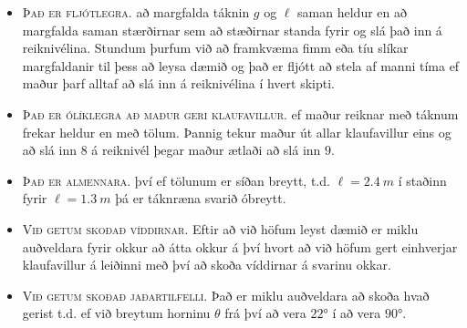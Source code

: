 \begin{itemize}
    \item \textsc{Það er fljótlegra.} að margfalda táknin $g$ og $\ell$ saman heldur en að margfalda saman stærðirnar sem að stæðirnar standa fyrir og slá það inn á reiknivélina. Stundum þurfum við að framkvæma fimm eða tíu slíkar margfaldanir til þess að leysa dæmið og það er fljótt að stela af manni tíma ef maður þarf alltaf að slá inn á reiknivélina í hvert skipti.
    
    \item \textsc{Það er ólíklegra að maður geri klaufavillur.} ef maður reiknar með táknum frekar heldur en með tölum. Þannig tekur maður út allar klaufavillur eins og að slá inn $8$ á reiknivél þegar maður ætlaði að slá inn $9$.
    
    \item \textsc{Það er almennara.} því ef tölunum er síðan breytt, t.d. $\ell = \SI{2.4}{m}$ í staðinn fyrir $\ell = \SI{1.3}{m}$ þá er táknræna svarið óbreytt.
    
    \item \textsc{Við getum skoðað víddirnar.} Eftir að við höfum leyst dæmið er miklu auðveldara fyrir okkur að átta okkur á því hvort að við höfum gert einhverjar klaufavillur á leiðinni með því að skoða víddirnar á svarinu okkar.
    
    
    \item \textsc{Við getum skoðað jaðartilfelli.} Það er miklu auðveldara að skoða hvað gerist t.d. ef við breytum horninu $\theta$ frá því að vera $\ang{22}$ í að vera $\ang{90}$.
\end{itemize}

\newpage

\tableofcontents

\newpage